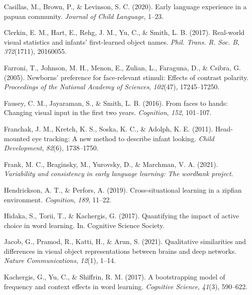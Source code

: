 \documentclass[10pt, letterpaper]{article}
\begin{document}
\leavevmode\hypertarget{ref-casillas2020early}{}%
Casillas, M., Brown, P., \& Levinson, S. C. (2020). Early language
experience in a papuan community. \emph{Journal of Child Language},
1--23.

\leavevmode\hypertarget{ref-clerkin2017}{}%
Clerkin, E. M., Hart, E., Rehg, J. M., Yu, C., \& Smith, L. B. (2017).
Real-world visual statistics and infants' first-learned object names.
\emph{Phil. Trans. R. Soc. B}, \emph{372}(1711), 20160055.

\leavevmode\hypertarget{ref-farroni2005newborns}{}%
Farroni, T., Johnson, M. H., Menon, E., Zulian, L., Faraguna, D., \&
Csibra, G. (2005). Newborns' preference for face-relevant stimuli:
Effects of contrast polarity. \emph{Proceedings of the National Academy
of Sciences}, \emph{102}(47), 17245--17250.

\leavevmode\hypertarget{ref-fausey2016}{}%
Fausey, C. M., Jayaraman, S., \& Smith, L. B. (2016). From faces to
hands: Changing visual input in the first two years. \emph{Cognition},
\emph{152}, 101--107.

\leavevmode\hypertarget{ref-franchak2011}{}%
Franchak, J. M., Kretch, K. S., Soska, K. C., \& Adolph, K. E. (2011).
Head-mounted eye tracking: A new method to describe infant looking.
\emph{Child Development}, \emph{82}(6), 1738--1750.

\leavevmode\hypertarget{ref-frank2021}{}%
Frank, M. C., Braginsky, M., Yurovsky, D., \& Marchman, V. A. (2021).
\emph{Variability and consistency in early language learning: The
wordbank project}.

\leavevmode\hypertarget{ref-hendrickson2019cross}{}%
Hendrickson, A. T., \& Perfors, A. (2019). Cross-situational learning in
a zipfian environment. \emph{Cognition}, \emph{189}, 11--22.

\leavevmode\hypertarget{ref-hidaka2017quantifying}{}%
Hidaka, S., Torii, T., \& Kachergis, G. (2017). Quantifying the impact
of active choice in word learning. In. Cognitive Science Society.

\leavevmode\hypertarget{ref-jacob2021qualitative}{}%
Jacob, G., Pramod, R., Katti, H., \& Arun, S. (2021). Qualitative
similarities and differences in visual object representations between
brains and deep networks. \emph{Nature Communications}, \emph{12}(1),
1--14.

\leavevmode\hypertarget{ref-kachergis2017bootstrapping}{}%
Kachergis, G., Yu, C., \& Shiffrin, R. M. (2017). A bootstrapping model
of frequency and context effects in word learning. \emph{Cognitive
Science}, \emph{41}(3), 590--622.
\end{document}
